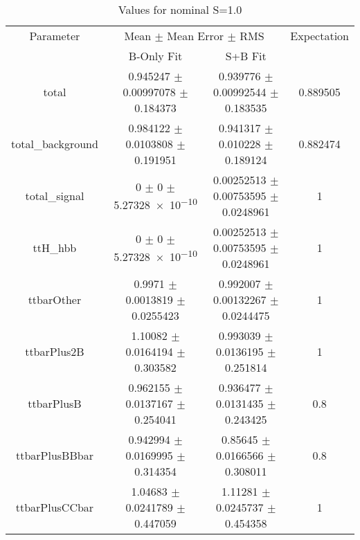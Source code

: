 \begin{table}
\centering
\caption{Values for nominal S=1.0}
\begin{tabular}{cccc}
\toprule
Parameter & \multicolumn{2}{c}{Mean $\pm$ Mean Error $\pm$ RMS} & Expectation\\
 & B-Only Fit & S+B Fit & \\
\midrule
total & \num{0.945247} $\pm$ \num{0.00997078} $\pm$ \num{0.184373} & \num{0.939776} $\pm$ \num{0.00992544} $\pm$ \num{0.183535} & \num{0.889505}\\
total\_background & \num{0.984122} $\pm$ \num{0.0103808} $\pm$ \num{0.191951} & \num{0.941317} $\pm$ \num{0.010228} $\pm$ \num{0.189124} & \num{0.882474}\\
total\_signal & \num{0} $\pm$ \num{0} $\pm$ \num{5.27328e-10} & \num{0.00252513} $\pm$ \num{0.00753595} $\pm$ \num{0.0248961} & \num{1}\\
ttH\_hbb & \num{0} $\pm$ \num{0} $\pm$ \num{5.27328e-10} & \num{0.00252513} $\pm$ \num{0.00753595} $\pm$ \num{0.0248961} & \num{1}\\
ttbarOther & \num{0.9971} $\pm$ \num{0.0013819} $\pm$ \num{0.0255423} & \num{0.992007} $\pm$ \num{0.00132267} $\pm$ \num{0.0244475} & \num{1}\\
ttbarPlus2B & \num{1.10082} $\pm$ \num{0.0164194} $\pm$ \num{0.303582} & \num{0.993039} $\pm$ \num{0.0136195} $\pm$ \num{0.251814} & \num{1}\\
ttbarPlusB & \num{0.962155} $\pm$ \num{0.0137167} $\pm$ \num{0.254041} & \num{0.936477} $\pm$ \num{0.0131435} $\pm$ \num{0.243425} & \num{0.8}\\
ttbarPlusBBbar & \num{0.942994} $\pm$ \num{0.0169995} $\pm$ \num{0.314354} & \num{0.85645} $\pm$ \num{0.0166566} $\pm$ \num{0.308011} & \num{0.8}\\
ttbarPlusCCbar & \num{1.04683} $\pm$ \num{0.0241789} $\pm$ \num{0.447059} & \num{1.11281} $\pm$ \num{0.0245737} $\pm$ \num{0.454358} & \num{1}\\
\bottomrule
\end{tabular}
\end{table}